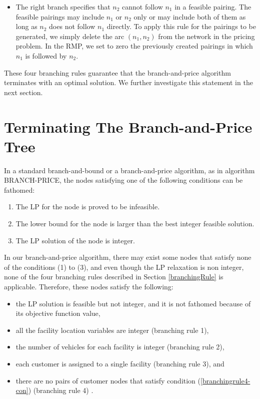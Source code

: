 \begin {itemize}
\begin{itemize}
  \item The right branch specifies that $n_2$ cannot follow $n_1$ in a feasible pairing. The feasible pairings 
  may include $n_1$ or $n_2$ only or may include both of them as long as $n_2$ does not follow $n_1$ directly. 
  To apply this rule for the pairings to be generated, we simply delete the arc $(n_1,n_2)$ 
  from the network in the pricing problem. In the RMP, we set to zero the previously 
  created pairings in which $n_1$ is followed by $n_2$.
\end{itemize}
\end{itemize}

These four branching rules guarantee that the branch-and-price algorithm
terminates with an optimal solution. We further investigate 
this statement in the next section. 

\section {Terminating The Branch-and-Price Tree}
\label{BPAlg-Opt}
In a standard branch-and-bound or a branch-and-price algorithm, as in algorithm 
BRANCH-PRICE, the nodes satisfying one of the following conditions can be fathomed:
\begin{enumerate}
\item The LP for the node is proved to be infeasible.
\item The lower bound for the node is larger than the best integer feasible 
  solution. 
\item The LP solution of the node is integer. 
\end{enumerate}
In our branch-and-price algorithm, there may exist some nodes that satisfy 
none of the conditions (1) to (3), and even though the LP relaxation is 
non integer, none of the four branching rules described in Section \ref{branchingRule} 
is applicable. Therefore, these nodes satisfy the following:
\begin{itemize} 
\item [i.] the LP solution is feasible but not integer, and it is not fathomed 
  because of its objective function value, 
\item [ii.] all the facility location variables are integer (branching rule 1), 
\item [iii.] the number of vehicles for each facility is integer (branching rule 2), 
\item [iv.] each customer is assigned to a single facility (branching rule 3), and 
\item [v.]there are no pairs of customer nodes that satisfy condition  
  (\ref{branchingrule4-con}) (branching rule 4) .
\end{itemize}

